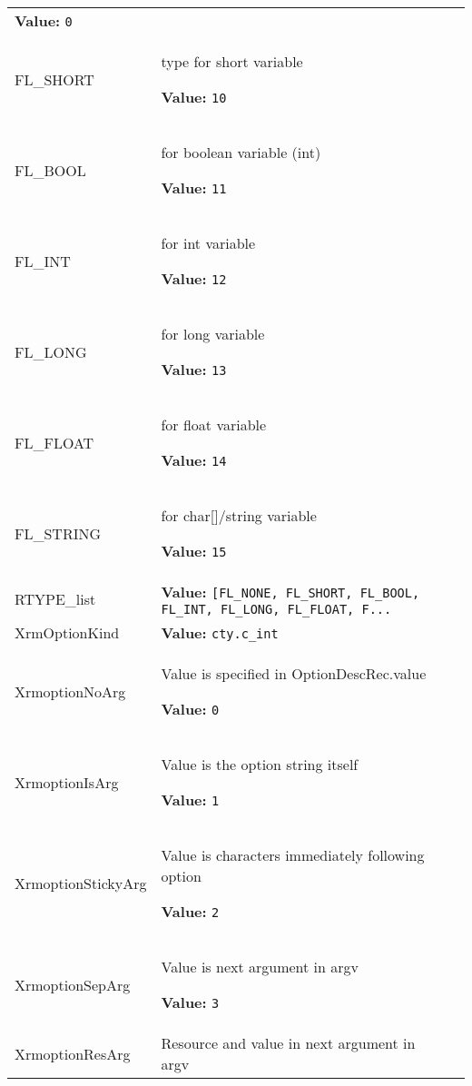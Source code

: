 \begin{longtable}{|p{\varnamewidth}|p{\vardescrwidth}|l}
\textbf{Value:} 
{\tt 0}&\\
\cline{1-2}
\raggedright F\-L\-\_\-S\-H\-O\-R\-T\- & \raggedright type for short variable

\textbf{Value:} 
{\tt 10}&\\
\cline{1-2}
\raggedright F\-L\-\_\-B\-O\-O\-L\- & \raggedright for boolean variable (int)

\textbf{Value:} 
{\tt 11}&\\
\cline{1-2}
\raggedright F\-L\-\_\-I\-N\-T\- & \raggedright for int variable

\textbf{Value:} 
{\tt 12}&\\
\cline{1-2}
\raggedright F\-L\-\_\-L\-O\-N\-G\- & \raggedright for long variable

\textbf{Value:} 
{\tt 13}&\\
\cline{1-2}
\raggedright F\-L\-\_\-F\-L\-O\-A\-T\- & \raggedright for float variable

\textbf{Value:} 
{\tt 14}&\\
\cline{1-2}
\raggedright F\-L\-\_\-S\-T\-R\-I\-N\-G\- & \raggedright for char{[}{]}/string variable

\textbf{Value:} 
{\tt 15}&\\
\cline{1-2}
\raggedright R\-T\-Y\-P\-E\-\_\-l\-i\-s\-t\- & \raggedright \textbf{Value:} 
{\tt [FL\_NONE, FL\_SHORT, FL\_BOOL, FL\_INT, FL\_LONG, FL\_FLOAT, F\texttt{...}}&\\
\cline{1-2}
\raggedright X\-r\-m\-O\-p\-t\-i\-o\-n\-K\-i\-n\-d\- & \raggedright \textbf{Value:} 
{\tt cty.c\_int}&\\
\cline{1-2}
\raggedright X\-r\-m\-o\-p\-t\-i\-o\-n\-N\-o\-A\-r\-g\- & \raggedright Value is specified in OptionDescRec.value

\textbf{Value:} 
{\tt 0}&\\
\cline{1-2}
\raggedright X\-r\-m\-o\-p\-t\-i\-o\-n\-I\-s\-A\-r\-g\- & \raggedright Value is the option string itself

\textbf{Value:} 
{\tt 1}&\\
\cline{1-2}
\raggedright X\-r\-m\-o\-p\-t\-i\-o\-n\-S\-t\-i\-c\-k\-y\-A\-r\-g\- & \raggedright Value is characters immediately following option

\textbf{Value:} 
{\tt 2}&\\
\cline{1-2}
\raggedright X\-r\-m\-o\-p\-t\-i\-o\-n\-S\-e\-p\-A\-r\-g\- & \raggedright Value is next argument in argv

\textbf{Value:} 
{\tt 3}&\\
\cline{1-2}
\raggedright X\-r\-m\-o\-p\-t\-i\-o\-n\-R\-e\-s\-A\-r\-g\- & \raggedright Resource and value in next argument in argv


\end{longtable}
